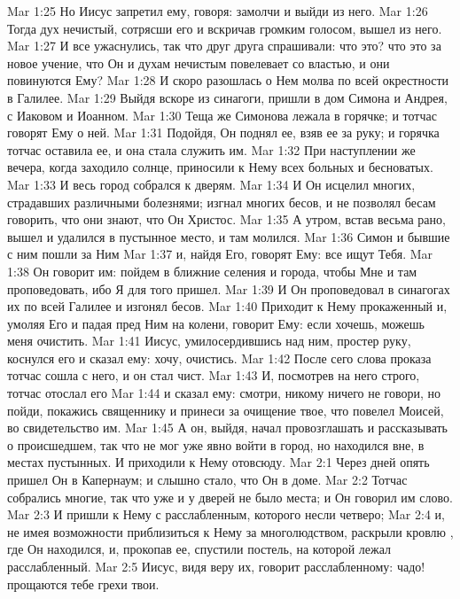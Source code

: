 \vs Mar 1:25 Но Иисус запретил ему, говоря: замолчи и выйди из него.
\vs Mar 1:26 Тогда дух нечистый, сотрясши его и вскричав громким голосом, вышел из него.
\vs Mar 1:27 И все ужаснулись, так что друг друга спрашивали: что это? что это за новое учение, что Он и духам нечистым повелевает со властью, и они повинуются Ему?
\vs Mar 1:28 И скоро разошлась о Нем молва по всей окрестности в Галилее.
\rsbpar\vs Mar 1:29 Выйдя вскоре из синагоги, пришли в дом Симона и Андрея, с Иаковом и Иоанном.
\vs Mar 1:30 Теща же Симонова лежала в горячке; и тотчас говорят Ему о ней.
\vs Mar 1:31 Подойдя, Он поднял ее, взяв ее за руку; и горячка тотчас оставила ее, и она стала служить им.
\vs Mar 1:32 При наступлении же вечера, когда заходило солнце, приносили к Нему всех больных и бесноватых.
\vs Mar 1:33 И весь город собрался к дверям.
\vs Mar 1:34 И Он исцелил многих, страдавших различными болезнями; изгнал многих бесов, и не позволял бесам говорить, что они знают, что Он Христос.
\rsbpar\vs Mar 1:35 А утром, встав весьма рано, вышел и удалился в пустынное место, и там молился.
\vs Mar 1:36 Симон и бывшие с ним пошли за Ним
\vs Mar 1:37 и, найдя Его, говорят Ему: все ищут Тебя.
\vs Mar 1:38 Он говорит им: пойдем в ближние селения и города, чтобы Мне и там проповедовать, ибо Я для того пришел.
\vs Mar 1:39 И Он проповедовал в синагогах их по всей Галилее и изгонял бесов.
\rsbpar\vs Mar 1:40 Приходит к Нему прокаженный и, умоляя Его и падая пред Ним на колени, говорит Ему: если хочешь, можешь меня очистить.
\vs Mar 1:41 Иисус, умилосердившись над ним, простер руку, коснулся его и сказал ему: хочу, очистись.
\vs Mar 1:42 После сего слова проказа тотчас сошла с него, и он стал чист.
\vs Mar 1:43 И, посмотрев на него строго, тотчас отослал его
\vs Mar 1:44 и сказал ему: смотри, никому ничего не говори, но пойди, покажись священнику и принеси за очищение твое, что повелел Моисей, во свидетельство им.
\vs Mar 1:45 А он, выйдя, начал провозглашать и рассказывать о происшедшем, так что  не мог уже явно войти в город, но находился вне, в местах пустынных. И приходили к Нему отовсюду.
\vs Mar 2:1 Через  дней опять пришел Он в Капернаум; и слышно стало, что Он в доме.
\vs Mar 2:2 Тотчас собрались многие, так что уже и у дверей не было места; и Он говорил им слово.
\vs Mar 2:3 И пришли к Нему с расслабленным, которого несли четверо;
\vs Mar 2:4 и, не имея возможности приблизиться к Нему за многолюдством, раскрыли кровлю , где Он находился, и, прокопав ее, спустили постель, на которой лежал расслабленный.
\vs Mar 2:5 Иисус, видя веру их, говорит расслабленному: чадо! прощаются тебе грехи твои.
